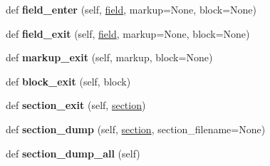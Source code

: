 \begin{DoxyCompactItemize}
def {\bfseries field\+\_\+enter} (self, \hyperlink{structfield}{field}, markup=None, block=None)
\item 
\mbox{\label{classformatter_1_1_formatter_ad3b5dac71f3808724b5c85ac0cb065ed}} 
def {\bfseries field\+\_\+exit} (self, \hyperlink{structfield}{field}, markup=None, block=None)
\item 
\mbox{\label{classformatter_1_1_formatter_a49b329e9fa4cb4bcd1faca179d4128b1}} 
def {\bfseries markup\+\_\+exit} (self, markup, block=None)
\item 
\mbox{\label{classformatter_1_1_formatter_a19154a0673544d248f4a5bfd75d1898e}} 
def {\bfseries block\+\_\+exit} (self, block)
\item 
\mbox{\label{classformatter_1_1_formatter_a933962d38ca3f2833b81a7efddf38b0b}} 
def {\bfseries section\+\_\+exit} (self, \hyperlink{structsection}{section})
\item 
\mbox{\label{classformatter_1_1_formatter_af4f9260c0b72d776309dbec7d6757c3f}} 
def {\bfseries section\+\_\+dump} (self, \hyperlink{structsection}{section}, section\+\_\+filename=None)
\item 
\mbox{\label{classformatter_1_1_formatter_a57f88f223b63dc34b927b84f6253e00d}} 
def {\bfseries section\+\_\+dump\+\_\+all} (self)
\end{DoxyCompactItemize}
